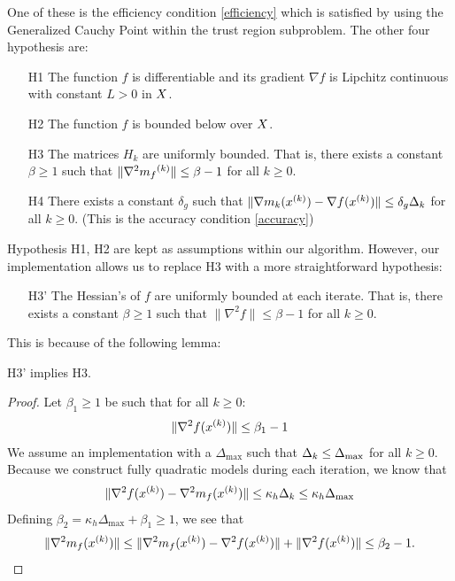 One of these is the efficiency condition \cref{efficiency} which is satisfied by using the Generalized Cauchy Point \cite{Conn:2000:TM:357813} within the trust region subproblem.
The other four hypothesis are:
\begin{itemize}
\item[H1] The function $f$ is differentiable and its gradient $\nabla f$ is Lipchitz continuous with constant $L > 0$ in $X$.
\item[H2] The function $f$ is bounded below over $X$.
\item[H3] The matrices $H_k$ are uniformly bounded. That is, there exists a constant $\beta \ge 1$ such that $\|\nabla^2 {{m}_f}^{(k)}\| \le \beta - 1$ for all $k \ge 0$.
\item[H4] There exists a constant $\delta_g$ such that $\|\nabla m_k({x^{(k)}}) - \nabla f({x^{(k)}})\| \le \delta_g \Delta_k$ for all $k \ge 0$. (This is the accuracy condition \cref{accuracy})
\end{itemize}

Hypothesis H1, H2 are kept as assumptions within our algorithm.
However, our implementation allows us to replace H3 with a more straightforward hypothesis:
\begin{itemize}
\item[H3'] The Hessian's of $f$ are uniformly bounded at each iterate. That is, there exists a constant $\beta \ge 1$ such that $\|\nabla^2 f\| \le \beta - 1$ for all $k \ge 0$.
\end{itemize}

This is because of the following lemma:

\begin{lemma}
H3' implies H3.
\end{lemma}

\begin{proof}
Let $\beta_1 \ge 1$ be such that for all $k \ge 0$:
\begin{align*}
\|\nabla^2 f({x^{(k)}}) \| \le \beta_1 - 1
\end{align*}
We assume an implementation with a $\Delta_{\text{max}}$ such that $\Delta_k \le \Delta_{\text{max}}$ for all $k \ge 0$.
Because we construct fully quadratic models during each iteration, we know that
\begin{align*}
\|\nabla^2 f({x^{(k)}}) - \nabla^2 m_f({x^{(k)}}) \| \le \kappa_{h} \Delta_k \le \kappa_{h} \Delta_{\text{max}}
\end{align*}
Defining $\beta_2 = \kappa_{h} \Delta_{\text{max}} + \beta_1 \ge 1$, we see that
\begin{align*}
\|\nabla^2 m_{f}({x^{(k)}}) \| \le \|\nabla^2 m_{f}({x^{(k)}}) - \nabla^2 f({x^{(k)}})  \| + \|\nabla^2 f({x^{(k)}}) \|  \le \beta_2 - 1 .
\end{align*}

\end{proof}



